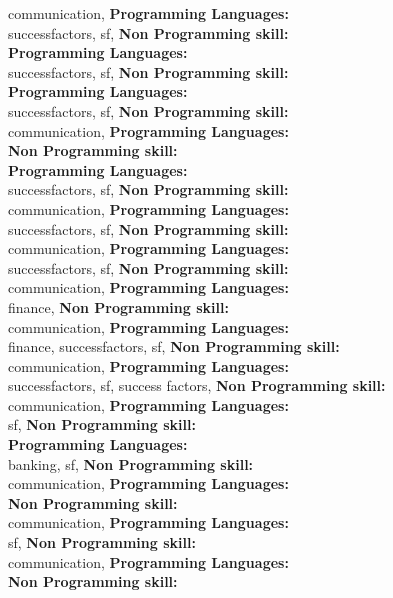 communication, \textbf{Programming Languages:} \\
successfactors, sf, \textbf{Non Programming skill:} \\
\textbf{Programming Languages:} \\
successfactors, sf, \textbf{Non Programming skill:} \\
\textbf{Programming Languages:} \\
successfactors, sf, \textbf{Non Programming skill:} \\
communication, \textbf{Programming Languages:} \\
\textbf{Non Programming skill:} \\
\textbf{Programming Languages:} \\
successfactors, sf, \textbf{Non Programming skill:} \\
communication, \textbf{Programming Languages:} \\
successfactors, sf, \textbf{Non Programming skill:} \\
communication, \textbf{Programming Languages:} \\
successfactors, sf, \textbf{Non Programming skill:} \\
communication, \textbf{Programming Languages:} \\
finance, \textbf{Non Programming skill:} \\
communication, \textbf{Programming Languages:} \\
finance, successfactors, sf, \textbf{Non Programming skill:} \\
communication, \textbf{Programming Languages:} \\
successfactors, sf, success factors, \textbf{Non Programming skill:} \\
communication, \textbf{Programming Languages:} \\
sf, \textbf{Non Programming skill:} \\
\textbf{Programming Languages:} \\
banking, sf, \textbf{Non Programming skill:} \\
communication, \textbf{Programming Languages:} \\
\textbf{Non Programming skill:} \\
communication, \textbf{Programming Languages:} \\
sf, \textbf{Non Programming skill:} \\
communication, \textbf{Programming Languages:} \\
\textbf{Non Programming skill:} \\
